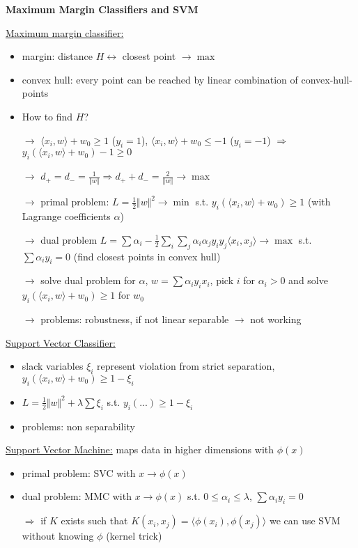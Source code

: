 \documentclass[10pt,landscape,a4paper]{article}
\begin{document}
\begin{multicols*}{4}
\begin{center}
	\normalsize{\textbf{Maximum Margin Classifiers and SVM}} \\
\end{center}
\underline{Maximum margin classifier:}
\begin{itemize}
	\item margin: distance $H \leftrightarrow$ closest point $\to\max$
	\item convex hull: every point can be reached by linear combination of convex-hull-points
	\item How to find $H$?
	\item[$\to$] $\langle x_i,w\rangle + w_0\ge 1$ ($y_i=1$), $\langle x_i,w\rangle + w_0\le -1$ ($y_i=-1$) $\Rightarrow$ $y_i(\langle x_i,w\rangle + w_0)-1\ge 0$
	\item[$\to$] $d_+ = d_- = \frac{1}{\Vert w\Vert} \Rightarrow d_++d_-=\frac{2}{\Vert w\Vert}\to\max$
	\item[$\to$] primal problem: $L=\frac{1}{2}\Vert w\Vert^2\to\min$ s.t. $y_i(\langle x_i,w\rangle + w_0)\ge 1$ (with Lagrange coefficients $\alpha$)
	\item[$\to$] dual problem $L=\sum\alpha_i-\frac{1}{2}\sum_i\sum_j\alpha_i\alpha_jy_iy_j\langle x_i,x_j\rangle\to\max$ s.t. $\sum\alpha_iy_i = 0$ (find closest points in convex hull)
	\item[$\to$] solve dual problem for $\alpha$, $w=\sum\alpha_iy_ix_i$, pick $i$ for $\alpha_i>0$ and solve $y_i(\langle x_i,w\rangle + w_0)\ge 1$ for $w_0$
	\item[$\to$] problems: robustness, if not linear separable $\to$ not working
\end{itemize}
\underline{Support Vector Classifier:}
\begin{itemize}
	\item slack variables $\xi_i$ represent violation from strict separation, $y_i(\langle x_i,w\rangle + w_0)\ge 1-\xi_i$
	\item $L=\frac{1}{2}\Vert w\Vert^2 + \lambda\sum \xi_i$ s.t. $y_i(...)\ge 1-\xi_i$
	\item problems: non separability
\end{itemize}
\underline{Support Vector Machine:} maps data in higher dimensions with $\phi(x)$
\begin{itemize}
	\item primal problem: SVC with $x\to \phi(x)$
	\item dual problem: MMC with $x\to \phi(x)$ s.t. $0\le\alpha_i\le\lambda$, $\sum\alpha_iy_i = 0$
	\item[$\Rightarrow$] if $K$ exists such that $K(x_i,x_j)=\langle \phi(x_i),\phi(x_j)\rangle$ we can use SVM without knowing $\phi$ (kernel trick)

\end{itemize}
\end{multicols*}
\end{document}
